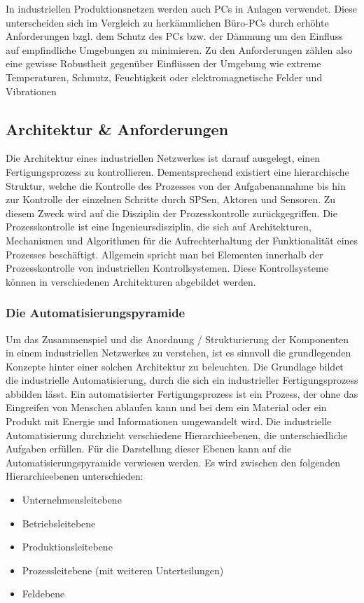 In industriellen Produktionsnetzen werden auch PCs in Anlagen verwendet. Diese unterscheiden sich im Vergleich zu herkämmlichen Büro-PCs durch erhöhte Anforderungen bzgl. dem Schutz des PCs bzw. der Dämmung um den Einfluss auf empfindliche Umgebungen zu minimieren. Zu den Anforderungen zählen also eine gewisse Robustheit gegenüber Einflüssen der Umgebung wie extreme Temperaturen, Schmutz, Feuchtigkeit oder elektromagnetische Felder und Vibrationen


\subsection{Architektur \&  Anforderungen}
Die Architektur eines industriellen Netzwerkes ist darauf ausgelegt, einen Fertigungsprozess zu kontrollieren. Dementsprechend existiert eine hierarchische Struktur, welche die Kontrolle des Prozesses von der Aufgabenannahme bis hin zur Kontrolle der einzelnen Schritte durch SPSen, Aktoren und Sensoren. Zu diesem Zweck wird auf die Disziplin der Prozesskontrolle zurückgegriffen. Die Prozesskontrolle ist eine Ingenieursdisziplin, die sich auf Architekturen, Mechanismen und Algorithmen für die Aufrechterhaltung der Funktionalität eines Prozesses beschäftigt. Allgemein spricht man bei Elementen innerhalb der Prozesskontrolle von industriellen Kontrollsystemen. Diese Kontrollsysteme können in verschiedenen Architekturen abgebildet werden.

\subsubsection{Die Automatisierungspyramide}
Um das Zusammenspiel und die Anordnung / Strukturierung der Komponenten in einem industriellen Netzwerkes zu verstehen, ist es sinnvoll die grundlegenden Konzepte hinter einer solchen Architektur zu beleuchten. 
Die Grundlage bildet die industrielle Automatisierung, durch die sich ein industrieller Fertigungsprozess abbilden lässt.
Ein automatisierter Fertigungsprozess ist ein Prozess, der ohne das Eingreifen von Menschen ablaufen kann und bei dem ein Material oder ein Produkt mit Energie und Informationen umgewandelt wird. 
Die industrielle Automatisierung durchzieht verschiedene Hierarchieebenen, die unterschiedliche Aufgaben erfüllen. Für die Darstellung dieser Ebenen kann auf die Automatisierungspyramide verwiesen werden.
Es wird zwischen den folgenden Hierarchieebenen unterschieden:
\begin{itemize}
\item Unternehmensleitebene
\item Betriebsleitebene
\item Produktionsleitebene
\item Prozessleitebene (mit weiteren Unterteilungen)
\item Feldebene
\end{itemize}

